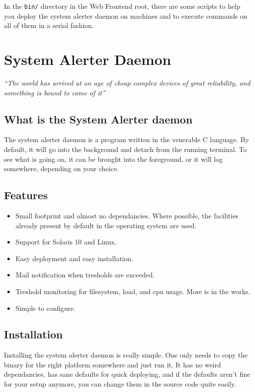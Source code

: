 \documentclass[a4paper,10pt,titlepage]{book}
\begin{document}
In the \texttt{bin/} directory in the Web Frontend root, there are some scripts to help you deploy the system alerter daemon on machines and to execute commands on all of them in a serial fashion.

\chapter{System Alerter Daemon}

\emph{``The world has arrived at an age of cheap complex devices of great reliability, and something is bound to come of it''}

\section{What is the System Alerter daemon}

The system alerter daemon is a program written in the venerable C language. By default, it will go into the background and detach from the running terminal. To see what is going on, it can be brought into the foreground, or it will log somewhere, depending on your choice.

\section{Features}

\begin{itemize}
 \item Small footprint and almost no dependancies. Where possible, the facilities already present by default in the operating system are used.
 \item Support for Solaris 10 and Linux.
 \item Easy deployment and easy installation.
 \item Mail notification when tresholds are exceeded.
 \item Treshold monitoring for filesystem, load, and cpu usage. More is in the works.
 \item Simple to configure.
\end{itemize}


\section{Installation}

Installing the system alerter daemon is really simple. One only needs to copy the binary for the right platform somewhere and just run it. It has no weird dependancies, has sane defaults for quick deploying, and if the defaults aren't fine for your setup anymore, you can change them in the source code quite easily.
\end{document}
